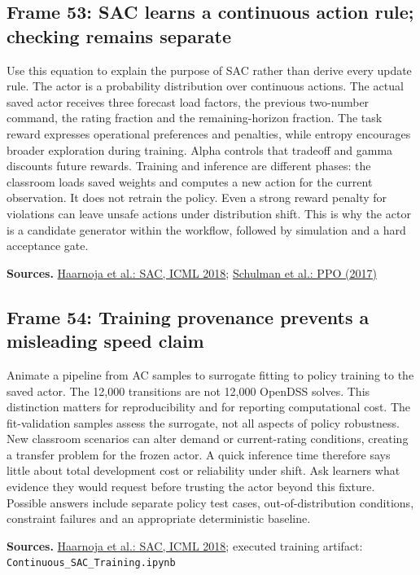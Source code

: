 \documentclass[11pt]{article}
\begin{document}
\subsection*{Frame 53: SAC learns a continuous action rule; checking remains separate}
Use this equation to explain the purpose of SAC rather than derive every update rule. The actor is a probability distribution over continuous actions. The actual saved actor receives three forecast load factors, the previous two-number command, the rating fraction and the remaining-horizon fraction. The task reward expresses operational preferences and penalties, while entropy encourages broader exploration during training. Alpha controls that tradeoff and gamma discounts future rewards. Training and inference are different phases: the classroom loads saved weights and computes a new action for the current observation. It does not retrain the policy. Even a strong reward penalty for violations can leave unsafe actions under distribution shift. This is why the actor is a candidate generator within the workflow, followed by simulation and a hard acceptance gate.\par
\par\nopagebreak\begin{minipage}{\linewidth}{\footnotesize\color{slate}\textbf{Sources.} \href{https://proceedings.mlr.press/v80/haarnoja18b.html}{Haarnoja et al.: SAC, ICML 2018}; \href{https://arxiv.org/abs/1707.06347}{Schulman et al.: PPO (2017)}\par}\end{minipage}\par\medskip
\subsection*{Frame 54: Training provenance prevents a misleading speed claim}
Animate a pipeline from AC samples to surrogate fitting to policy training to the saved actor. The 12,000 transitions are not 12,000 OpenDSS solves. This distinction matters for reproducibility and for reporting computational cost. The fit-validation samples assess the surrogate, not all aspects of policy robustness. New classroom scenarios can alter demand or current-rating conditions, creating a transfer problem for the frozen actor. A quick inference time therefore says little about total development cost or reliability under shift. Ask learners what evidence they would request before trusting the actor beyond this fixture. Possible answers include separate policy test cases, out-of-distribution conditions, constraint failures and an appropriate deterministic baseline.\par
\par\nopagebreak\begin{minipage}{\linewidth}{\footnotesize\color{slate}\textbf{Sources.} \href{https://proceedings.mlr.press/v80/haarnoja18b.html}{Haarnoja et al.: SAC, ICML 2018}; executed training artifact: \texttt{Continuous\_SAC\_Training.ipynb}\par}\end{minipage}\par\medskip
\end{document}
